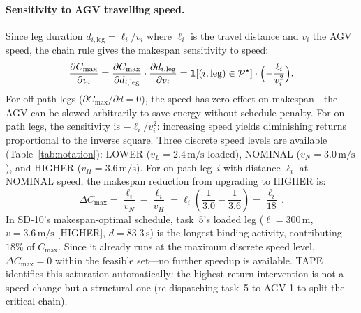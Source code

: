\documentclass[11pt]{article}
\begin{document}
\paragraph{Sensitivity to AGV travelling speed.}
Since leg duration $d_{i,\text{leg}} = \ell_i / v_i$ where $\ell_i$ is the travel distance
and $v_i$ the AGV speed, the chain rule gives the makespan sensitivity to speed:
\begin{equation}\label{eq:speed_sens}
  \frac{\partial C_{\max}}{\partial v_i}
  = \frac{\partial C_{\max}}{\partial d_{i,\text{leg}}} \cdot \frac{\partial d_{i,\text{leg}}}{\partial v_i}
  = \mathbf{1}[(i,\text{leg})\in\mathcal{P}^\star] \cdot \Bigl(-\frac{\ell_i}{v_i^2}\Bigr).
\end{equation}
For off-path legs ($\partial C_{\max}/\partial d = 0$), the speed has zero effect on
makespan---the AGV can be slowed arbitrarily to save energy without schedule penalty. For
on-path legs, the sensitivity is $-\ell_i/v_i^2$: increasing speed yields diminishing
returns proportional to the inverse square. Three discrete speed levels are available
(Table~\ref{tab:notation}): LOWER ($v_L = 2.4\,\mathrm{m/s}$ loaded), NOMINAL
($v_N = 3.0\,\mathrm{m/s}$), and HIGHER ($v_H = 3.6\,\mathrm{m/s}$). For on-path leg~$i$
with distance $\ell_i$ at NOMINAL speed, the makespan reduction from upgrading to HIGHER is:
\[
  \Delta C_{\max} = \frac{\ell_i}{v_N} - \frac{\ell_i}{v_H}
  = \ell_i\!\left(\frac{1}{3.0} - \frac{1}{3.6}\right) = \frac{\ell_i}{18}\,.
\]
In SD-10's makespan-optimal schedule, task~5's loaded leg ($\ell = 300\,\mathrm{m}$,
$v = 3.6\,\mathrm{m/s}$ [HIGHER], $d = 83.3\,\mathrm{s}$) is the longest binding
activity, contributing $18\%$ of $C_{\max}$. Since it already runs at the maximum
discrete speed level, $\Delta C_{\max} = 0$ within the feasible set---no further speedup
is available. TAPE identifies this saturation automatically: the highest-return
intervention is not a speed change but a structural one (re-dispatching task~5 to AGV-1
to split the critical chain).
\end{document}
